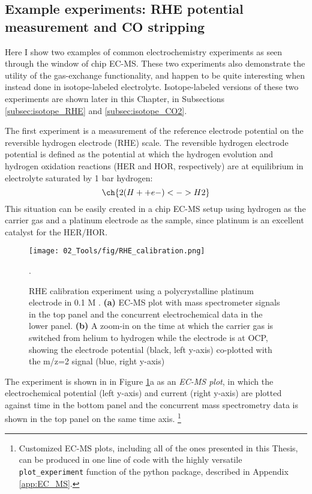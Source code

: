 \subsection{Example experiments: RHE potential measurement and CO stripping}\label{subsec:examples}
Here I show two examples of common electrochemistry experiments as seen through the window of chip EC-MS. These two experiments also demonstrate the utility of the gas-exchange functionality, and happen to be quite interesting when instead done in isotope-labeled electrolyte. Isotope-labeled versions of these two experiments are shown later in this Chapter, in Subsections \ref{subsec:isotope_RHE} and \ref{subsec:isotope_CO2}.

The first experiment is a measurement of the reference electrode potential on the reversible hydrogen electrode (RHE) scale. The reversible hydrogen electrode potential is defined as the potential at which the hydrogen evolution and hydrogen oxidation reactions (HER and HOR, respectively) are at equilibrium in electrolyte saturated by 1 bar hydrogen:
\begin{equation}
\ch{2 (H+ + e- ) <-> H2} \label{rxn:HER2p1}
\end{equation}
This situation can be easily created in a chip EC-MS setup using hydrogen as the carrier gas and a platinum electrode as the sample, since platinum is an excellent catalyst for the HER/HOR\cite{Nørskov2005a, Kemppainen2015, Tymoczko2016}. 

\begin{figure}[b!]
	\centering
	\texttt{[image: 02\_Tools/fig/RHE\_calibration.png]}
	\caption{RHE calibration experiment using a polycrystalline platinum electrode in 0.1 M . \textbf{(a)} EC-MS plot with mass spectrometer signals in the top panel and the concurrent electrochemical data in the lower panel. \textbf{(b)} A zoom-in on the time at which the carrier gas is switched from helium to hydrogen while the electrode is at OCP, showing the electrode potential (black, left y-axis) co-plotted with the m/z=2 signal (blue, right y-axis)}.
	\label{fig:RHE_cal}
\end{figure}

The experiment is shown in  in Figure \ref{fig:RHE_cal}a as an \textit{EC-MS plot}, in which the electrochemical potential (left y-axis) and current (right y-axis) are plotted against time in the bottom panel and the concurrent mass spectrometry data is shown in the top panel on the same time axis.
\footnote{Customized EC-MS plots, including all of the ones presented in this Thesis, can be produced in one line of code with the highly versatile \texttt{plot\_experiment} function of the  python package, described in Appendix \ref{app:EC_MS}.}

